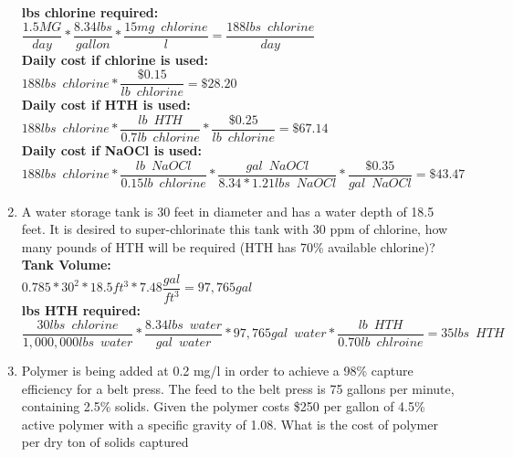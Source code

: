\begin{enumerate}
\textbf{lbs chlorine required:}\\
$\dfrac{1.5 MG}{day}*\dfrac{8.34lbs}{gallon}*\dfrac{15mg \enspace chlorine}{l}=\dfrac{188 lbs \enspace chlorine}{day}$\\
\vspace{0.25cm}
\textbf{Daily cost if chlorine is used:}\\
$188lbs \enspace chlorine*\dfrac{\$0.15}{lb \enspace chlorine}=\boxed{\$28.20}$\\
\vspace{0.25cm}
\textbf{Daily cost if HTH is used:}\\
$188lbs \enspace chlorine*\dfrac{lb \enspace HTH}{0.7lb \enspace chlorine}*\dfrac{\$0.25}{lb \enspace chlorine}=\boxed{\$67.14}$\\
\vspace{0.25cm}
\textbf{Daily cost if NaOCl is used:}\\
$188lbs \enspace chlorine*\dfrac{lb \enspace NaOCl}{0.15lb \enspace chlorine}*\dfrac{gal \enspace NaOCl}{8.34*1.21 lbs\enspace NaOCl}*\dfrac{\$0.35}{gal \enspace NaOCl}=\boxed{\$43.47}$
\vspace{0.25cm}
\item A water storage tank is 30 feet in diameter and has a water depth of 18.5 feet. It is desired to super-chlorinate this tank with 30 ppm of chlorine, how many pounds of HTH will be required (HTH has 70\% available chlorine)?\\    
\vspace{0.25cm}
\textbf{Tank Volume:}\\
\vspace{0.25cm}
$0.785*30^2*18.5ft^3*7.48\dfrac{gal}{ft^3}=97,765 gal$\\
\vspace{0.25cm}
\textbf{lbs HTH required:}\\
\vspace{0.25cm}
$\dfrac{30lbs \enspace chlorine}{1,000,000lbs  \enspace water}*\dfrac{8.34lbs \enspace water}{gal \enspace water}*97,765 gal \enspace water *\dfrac{lb \enspace HTH}{0.70lb \enspace chlroine}=\boxed{35 lbs \enspace HTH}$
\vspace{0.25cm}
\item Polymer is being added at 0.2 mg/l in order to achieve a 98\% capture efficiency for a belt press.  The feed to the belt press is 75 gallons per minute, containing 2.5\% solids.  Given the polymer costs \$250 per gallon of 4.5\% active polymer with a specific gravity of 1.08.  What is the cost of polymer per dry ton of solids captured  \\


\end{enumerate}
